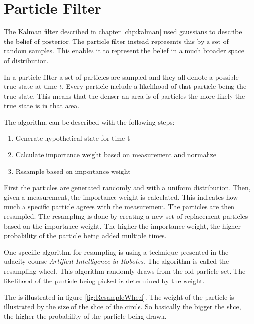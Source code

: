\chapter{Particle Filter}
\label{chp:partFilter}

The Kalman filter described in chapter \ref{chp:kalman} used gaussians to describe the belief of posterior. The particle filter instead represents this by a set of random samples. This enables it to represent the belief in a much broader space of distribution.

In a particle filter a set of particles are sampled and they all denote a possible true state at time $t$. Every particle include a likelihood of that particle being the true state. This means that the denser an area is of particles the more likely the true state is in that area.

The algorithm can be described with the following steps:
\begin{enumerate}
	\item Generate hypothetical state for time t 
	\item Calculate importance weight based on measurement and normalize
	\item Resample based on importance weight
\end{enumerate}

First the particles are generated randomly and with a uniform distribution. Then, given a measurement, the importance weight is calculated. This indicates how much a specific particle agrees with the measurement. The particles are then resampled. The resampling is done by creating a new set of replacement particles based on the importance weight. The higher the importance weight, the higher probability of the particle being added multiple times.

One specific algorithm for resampling is using a technique presented in the udacity course \emph{Artifical Intelligence in Robotcs}\citep{udacity}. The algorithm is called the resampling wheel. This algorithm randomly draws from the old particle set. The likelihood of the particle being picked is determined by the weight.



The is illustrated in figure \ref{fig:ResampleWheel}. The weight of the particle is illustrated by the size of the slice of the circle. So basically the bigger the slice, the higher the probability of the particle being drawn.

